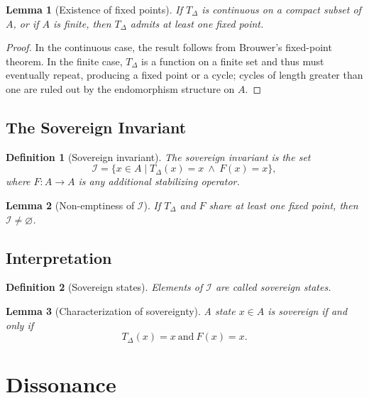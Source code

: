 \documentclass[12pt]{article}
\newtheorem{definition}{Definition}
\newtheorem{lemma}{Lemma}
\begin{document}
\begin{lemma}[Existence of fixed points]
If $T_\Delta$ is continuous on a compact subset of $A$, or if $A$ is
finite, then $T_\Delta$ admits at least one fixed point.
\end{lemma}

\begin{proof}
In the continuous case, the result follows from Brouwer's fixed-point
theorem. In the finite case, $T_\Delta$ is a function on a finite set and
thus must eventually repeat, producing a fixed point or a cycle; cycles
of length greater than one are ruled out by the endomorphism structure
on $A$.
\end{proof}

\subsection{The Sovereign Invariant}

\begin{definition}[Sovereign invariant]
The sovereign invariant is the set
\[
\mathcal{I}
=
\{x\in A \mid T_\Delta(x)=x\ \wedge\ F(x)=x\},
\]
where $F:A\to A$ is any additional stabilizing operator.
\end{definition}

\begin{lemma}[Non-emptiness of $\mathcal{I}$]
If $T_\Delta$ and $F$ share at least one fixed point, then
$\mathcal{I}\neq\varnothing$.
\end{lemma}

\subsection{Interpretation}

\begin{definition}[Sovereign states]
Elements of $\mathcal{I}$ are called sovereign states.
\end{definition}

\begin{lemma}[Characterization of sovereignty]
A state $x\in A$ is sovereign if and only if
\[
T_\Delta(x)=x\ \text{and}\ F(x)=x.
\]
\end{lemma}

\section{Dissonance}
\end{document}
